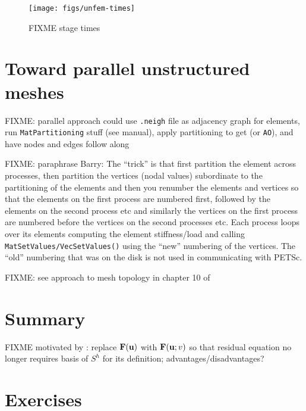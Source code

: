\begin{figure}
\texttt{[image: figs/unfem-times]}
\caption{FIXME stage times}
\label{fig:un:unfem-times}
\end{figure}


\section{Toward parallel unstructured meshes}

FIXME: parallel approach could use \Triangle \texttt{.neigh} file as adjacency graph for elements, run \texttt{MatPartitioning} stuff (see manual), apply partitioning to get \pIS (or \texttt{AO}), and have nodes and edges follow along

FIXME: paraphrase Barry: The ``trick'' is that first partition the element across processes, then partition the vertices (nodal values) subordinate to the partitioning of the elements and then you renumber the elements and vertices so that the elements on the first process are numbered first, followed by the elements on the second process etc and similarly the vertices on the first process are numbered before the vertices on the second processes etc.  Each process loops over its elements computing the element stiffness/load and calling \texttt{MatSetValues/VecSetValues()} using the ``new'' numbering of the vertices.  The ``old'' numbering that was on the disk is not used in communicating with PETSc.

FIXME: see approach to mesh topology in chapter 10 of \citep{Loggetal2012}


\section{Summary}

FIXME motivated by \citep{Loggetal2012}: replace $\mathbf{F}(\mathbf{u})$ with $\mathbf{F}(\mathbf{u};v)$ so that residual equation no longer requires basis of $S^h$ for its definition; advantages/disadvantages?


\section{Exercises}

